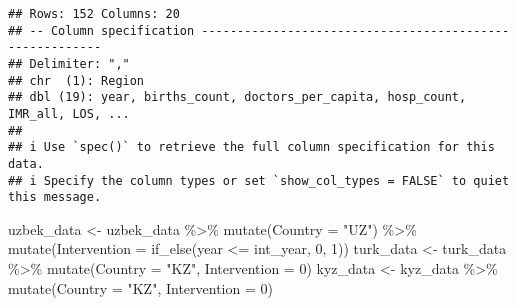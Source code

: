 \documentclass[
]{article}
\newenvironment{Shaded}{\begin{snugshade}}{\end{snugshade}}
\newcommand{\AttributeTok}[1]{\textcolor[rgb]{0.77,0.63,0.00}{#1}}
\newcommand{\DecValTok}[1]{\textcolor[rgb]{0.00,0.00,0.81}{#1}}
\newcommand{\FunctionTok}[1]{\textcolor[rgb]{0.00,0.00,0.00}{#1}}
\newcommand{\NormalTok}[1]{#1}
\newcommand{\OtherTok}[1]{\textcolor[rgb]{0.56,0.35,0.01}{#1}}
\newcommand{\SpecialCharTok}[1]{\textcolor[rgb]{0.00,0.00,0.00}{#1}}
\newcommand{\StringTok}[1]{\textcolor[rgb]{0.31,0.60,0.02}{#1}}
\begin{document}
\begin{verbatim}
## Rows: 152 Columns: 20
## -- Column specification --------------------------------------------------------
## Delimiter: ","
## chr  (1): Region
## dbl (19): year, births_count, doctors_per_capita, hosp_count, IMR_all, LOS, ...
## 
## i Use `spec()` to retrieve the full column specification for this data.
## i Specify the column types or set `show_col_types = FALSE` to quiet this message.
\end{verbatim}

\begin{Shaded}
\begin{Highlighting}[]
\NormalTok{uzbek\_data }\OtherTok{\textless{}{-}}\NormalTok{ uzbek\_data }\SpecialCharTok{\%\textgreater{}\%} 
  \FunctionTok{mutate}\NormalTok{(}\AttributeTok{Country =} \StringTok{"UZ"}\NormalTok{) }\SpecialCharTok{\%\textgreater{}\%}
  \FunctionTok{mutate}\NormalTok{(}\AttributeTok{Intervention =} \FunctionTok{if\_else}\NormalTok{(year }\SpecialCharTok{\textless{}=}\NormalTok{ int\_year, }\DecValTok{0}\NormalTok{, }\DecValTok{1}\NormalTok{))}
\NormalTok{turk\_data }\OtherTok{\textless{}{-}}\NormalTok{ turk\_data }\SpecialCharTok{\%\textgreater{}\%}
  \FunctionTok{mutate}\NormalTok{(}\AttributeTok{Country =} \StringTok{"KZ"}\NormalTok{, }\AttributeTok{Intervention =} \DecValTok{0}\NormalTok{) }
\NormalTok{kyz\_data }\OtherTok{\textless{}{-}}\NormalTok{ kyz\_data }\SpecialCharTok{\%\textgreater{}\%}
  \FunctionTok{mutate}\NormalTok{(}\AttributeTok{Country =} \StringTok{"KZ"}\NormalTok{, }\AttributeTok{Intervention =} \DecValTok{0}\NormalTok{)}


\end{Highlighting}
\end{Shaded}
\end{document}
